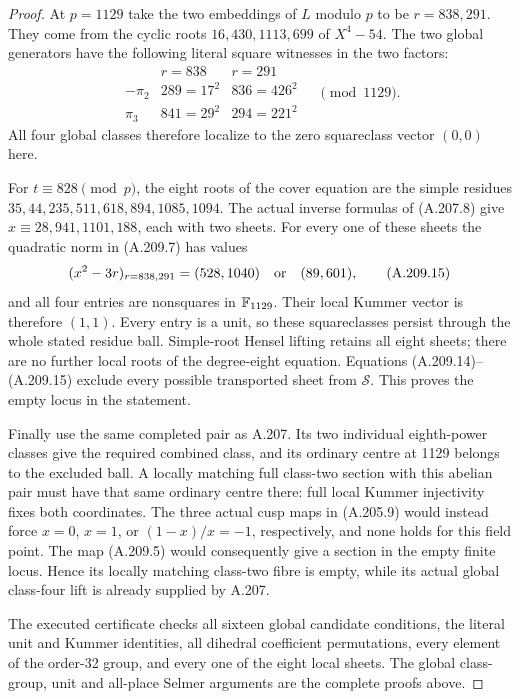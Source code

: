 \begin{proof}
At \(p=1129\) take the two embeddings of \(L\)
modulo \(p\) to be \(r=838,291\).
They come from the cyclic roots \(16,430,1113,699\)
of \(X^4-54\).  The two global generators have the
following literal square witnesses in the two factors:
\[
\begin{array}{c|cc}
 &r=838&r=291\\\hline
 -\pi_2&289=17^2&836=426^2\\
 \pi_3&841=29^2&294=221^2
\end{array}\quad\pmod {1129}.
\tag{A.209.14}
\]
All four global classes therefore localize to the zero
squareclass vector \((0,0)\) here.

For \(t\equiv828\pmod p\), the eight roots of the
cover equation are the simple residues
\(35,44,235,511,618,894,1085,1094\).
The actual inverse formulas of (A.207.8) give
\(x\equiv28,941,1101,188\), each with two sheets.
For every one of these sheets the quadratic norm in
(A.209.7) has values
\[
 (x^2-3r)_{r=838,291}=
       (528,1040)\quad\hbox{or}\quad(89,601),
\tag{A.209.15}
\]
and all four entries are nonsquares in \(\mathbb F_{1129}\).
Their local Kummer vector is therefore \((1,1)\).
Every entry is a unit, so these squareclasses persist
through the whole stated residue ball.
Simple-root Hensel lifting retains all eight sheets;
there are no further local roots of the degree-eight
equation.  Equations (A.209.14)--(A.209.15) exclude
every possible transported sheet from \(\mathcal S\).
This proves the empty locus in the statement.

Finally use the same completed pair as A.207.
Its two individual eighth-power classes give the
required combined class, and its ordinary centre at
1129 belongs to the excluded ball.  A locally matching
full class-two section with this abelian pair must have
that same ordinary centre there: full local Kummer
injectivity fixes both coordinates.  The three actual
cusp maps in (A.205.9) would instead force \(x=0\),
\(x=1\), or \((1-x)/x=-1\), respectively, and
none holds for this field point.
The map (A.209.5) would consequently give a section
in the empty finite locus.  Hence its locally matching
class-two fibre is empty, while its actual global
class-four lift is already supplied by A.207.

The executed certificate
checks all sixteen global candidate conditions, the
literal unit and Kummer identities, all dihedral
coefficient permutations, every element of the order-32
group, and every one of the eight local sheets.
The global class-group, unit and all-place Selmer arguments
are the complete proofs above.
\end{proof}
